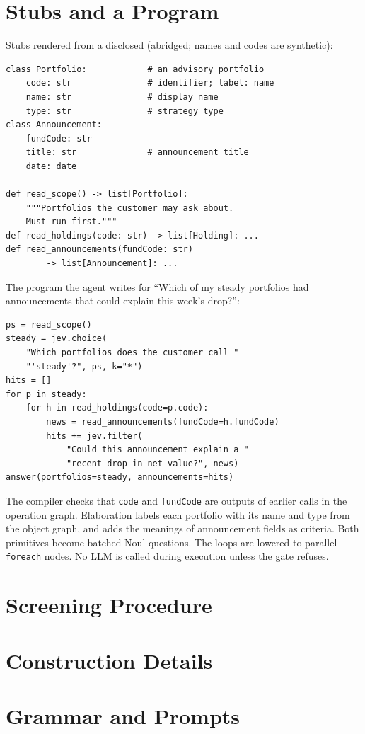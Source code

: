 \section{Stubs and a Program}
\label{app:program}
Stubs rendered from a disclosed \sog (abridged; names and codes are synthetic):
\begin{small}
\begin{verbatim}
class Portfolio:            # an advisory portfolio
    code: str               # identifier; label: name
    name: str               # display name
    type: str               # strategy type
class Announcement:
    fundCode: str
    title: str              # announcement title
    date: date

def read_scope() -> list[Portfolio]:
    """Portfolios the customer may ask about.
    Must run first."""
def read_holdings(code: str) -> list[Holding]: ...
def read_announcements(fundCode: str)
        -> list[Announcement]: ...
\end{verbatim}
\end{small}
The program the agent writes for ``Which of my steady portfolios had announcements that could explain this week's drop?'':
\begin{small}
\begin{verbatim}
ps = read_scope()
steady = jev.choice(
    "Which portfolios does the customer call "
    "'steady'?", ps, k="*")
hits = []
for p in steady:
    for h in read_holdings(code=p.code):
        news = read_announcements(fundCode=h.fundCode)
        hits += jev.filter(
            "Could this announcement explain a "
            "recent drop in net value?", news)
answer(portfolios=steady, announcements=hits)
\end{verbatim}
\end{small}
The compiler checks that \texttt{code} and \texttt{fundCode} are outputs of earlier calls in the operation graph. Elaboration labels each portfolio with its name and type from the object graph, and adds the meanings of announcement fields as criteria. Both primitives become batched Noul questions. The loops are lowered to parallel \texttt{foreach} nodes. No LLM is called during execution unless the gate refuses.

\section{Screening Procedure}
\label{app:screening}

\section{\sog Construction Details}
\label{app:construction}

\section{\pyif Grammar and Prompts}
\label{app:prompts}
